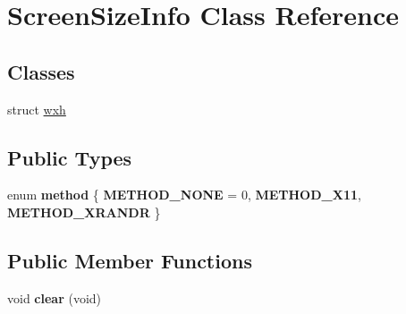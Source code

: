 \hypertarget{classScreenSizeInfo}{\section{Screen\-Size\-Info Class Reference}
\label{classScreenSizeInfo}
}
\subsection*{Classes}
\begin{DoxyCompactItemize}
\item 
struct \hyperlink{structScreenSizeInfo_1_1wxh}{wxh}
\end{DoxyCompactItemize}
\subsection*{Public Types}
\begin{DoxyCompactItemize}
\item 
enum {\bfseries method} \{ {\bfseries M\-E\-T\-H\-O\-D\-\_\-\-N\-O\-N\-E} = 0, 
{\bfseries M\-E\-T\-H\-O\-D\-\_\-\-X11}, 
{\bfseries M\-E\-T\-H\-O\-D\-\_\-\-X\-R\-A\-N\-D\-R}
 \}
\end{DoxyCompactItemize}
\subsection*{Public Member Functions}
\begin{DoxyCompactItemize}
\item 
\hypertarget{classScreenSizeInfo_aa0eff309e043f47a819db7f357007a74}{void {\bfseries clear} (void)}\label{classScreenSizeInfo_aa0eff309e043f47a819db7f357007a74}

\end{DoxyCompactItemize}
